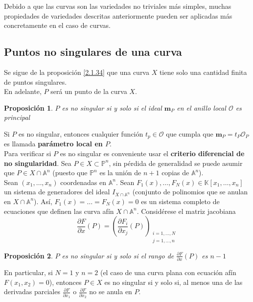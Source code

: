 \documentclass[12pt,a4paper]{report}
\newcommand{\msp}{\mathbf{m}_{P}}
\newcommand{\ea}{\mathbb{A}^{n}}
\newcommand{\Ou}{\mathscr{O}}
\newcommand{\ep}{\mathbb{P}^{n}}
\newcommand{\K}{\mathbb{K}}
\newtheorem{prop}{Proposición}[chapter]
\begin{document}
Debido a que las curvas son las variedades no triviales más simples, muchas propiedades de variedades descritas anteriormente pueden ser aplicadas más concretamente en el caso de curvas. 

\subsection{Puntos no singulares de una curva}
Se sigue de la proposición \ref{2.1.34} que una curva $X$ tiene solo una cantidad finita de puntos singulares. \\
En adelante, $P$ será un punto de la curva $X$.

\begin{prop}
	$P$ es no singular si y solo si el ideal $\msp  $ en el anillo local $\Ou$ es principal
\end{prop}

Si $P$ es no singular, entonces cualquier función $t_{p} \in \Ou$ que cumpla que $\msp = t_{P} \Ou_{P}$ es llamada \textbf{parámetro local en $P$}.\\

Para verificar si $P$ es no singular es conveniente usar el \textbf{criterio diferencial de no singularidad}. Sea $P \in X \subset \ep$, sin pérdida de generalidad se puede asumir que $ P \in X \cap \ea $ (puesto que $\ep$ es la unión de $n+1$ copias de $\ea$). \\
Sean $(x_{1}, \ldots , x_{n})$ coordenadas en $\ea$. Sean $F_{1}(x), \ldots , F_{N}(x)\in \K[ x_{1}, \ldots , x_{n} ]$ un sistema de generadores del ideal $I_{X\cap \ea}$ (conjunto de polinomios que se anulan en $X \cap \ea$). Así, $F_{1}(x) = \ldots = F_{N}(x)=0$ es un sistema completo de ecuaciones que definen las curva afín $X \cap \ea$. Considérese el matriz jacobiana
$$ \frac{\partial F}{\partial x} (P) = \left( \frac{\partial F_{i}}{\partial x_{j}} (P)  \right) _ { \begin{array}{c}
	i=1, \ldots , N\\
	j=1, \ldots , n
	\end{array} }$$

\begin{prop} \label{2.1.42}
	$P $ es no singular si y solo si el rango de $\frac{\partial F}{\partial x} (P)$ es $n-1$
\end{prop}

En particular, si $N=1$ y $n=2$ (el caso de una curva plana con ecuación afín $F(x_{1},x_{2})=0$), entonces $P \in X$ es no singular si y solo si, al menos una de las derivadas parciales $\frac{\partial F}{\partial x_{1}}$ o $\frac{\partial F}{\partial x_{2}}$ no se anula en $P$. 
\end{document}
